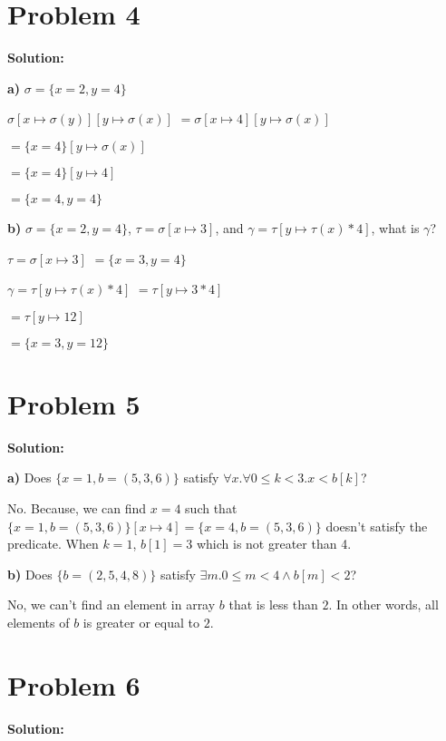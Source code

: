 \documentclass{article}
\begin{document}
\section*{Problem 4}
\textbf{Solution:}

\textbf{a)} $ \sigma= \{ x=2,y=4 \} $

\qquad $ \sigma[x \mapsto \sigma(y)][y \mapsto \sigma(x)] $ \qquad $= \sigma[x \mapsto 4][y \mapsto \sigma(x)]$

\qquad \qquad \qquad \qquad \qquad \qquad \qquad $ = \{x=4\}[y \mapsto \sigma(x)]$

\qquad \qquad \qquad \qquad \qquad \qquad \qquad $ = \{x=4\}[y \mapsto 4]$

\qquad \qquad \qquad \qquad \qquad \qquad \qquad $ = \{x=4, y=4\}$

\vspace{10pt}

\textbf{b)} $ \sigma= \{ x=2,y=4 \} $, $ \tau=\sigma[x \mapsto 3]$, and $ \gamma=\tau[y \mapsto \tau(x)*4] $, what is $\gamma$?

\qquad $ \tau=\sigma[x \mapsto 3]$ \qquad \qquad \qquad $ = \{x=3,y=4\} $

\qquad $ \gamma=\tau[y \mapsto \tau(x)*4] $ \qquad \quad $ = \tau[y \mapsto 3*4] $

\qquad \qquad \qquad \qquad \qquad \qquad \qquad $ = \tau[y \mapsto 12]$

\qquad \qquad \qquad \qquad \qquad \qquad \qquad $ = \{x=3,y=12\}$


\section*{Problem 5}
\textbf{Solution:}

\textbf{a)} Does $\{x = 1, b = (5, 3, 6)\}$ satisfy $\forall x. \forall 0 \leq k < 3.x<b[k]$?

No. Because, we can find $x=4$ such that $\{x = 1, b = (5, 3, 6)\}[x \mapsto 4]=\{x = 4, b = (5, 3, 6)\}$ doesn't satisfy the predicate. When $k=1$, $b[1]=3$ which is not greater than 4.

\vspace{10pt}

\textbf{b)} Does $\{b=(2,5,4,8)\}$ satisfy $\exists m.0 \leq m<4 \wedge b[m]<2$?

No, we can't find an element in array $b$ that is less than $2$. In other words, all elements of $b$ is greater or equal to $2$.


\section*{Problem 6}
\textbf{Solution:}
\end{document}
